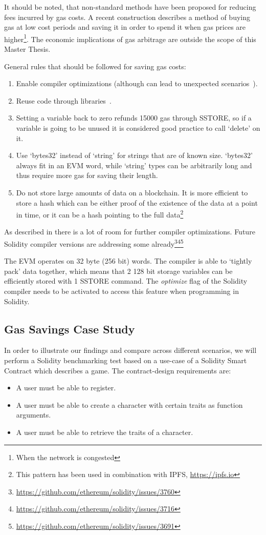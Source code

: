 It should be noted, that non-standard methods have been proposed for reducing fees incurred by gas costs. A recent construction \cite{gastoken} describes a method of buying gas at low cost periods and saving it in order to spend it when gas prices are higher\footnote{When the network is congested}. The economic implications of gas arbitrage are outside the scope of this Master Thesis. 

General rules that should be followed for saving gas costs:
\begin{enumerate}
    \item Enable compiler optimizations (although can lead to unexpected scenarios~\cite{compiler}).
    \item Reuse code through libraries~\cite{library}.
    \item Setting a variable back to zero refunds 15000 gas through SSTORE, so if a variable is going to be unused it is considered good practice to call `delete' on it. 
    \item Use `bytes32' instead of `string' for strings that are of known size. `bytes32' always fit in an EVM word, while `string' types can be arbitrarily long and thus require more gas for saving their length.
    \item Do not store large amounts of data on a blockchain. It is more efficient to store a hash which can be either proof of the existence of the data at a point in time, or it can be a hash pointing to the full data\footnote{This pattern has been used in combination with IPFS, \url{https://ipfs.io}}
\end{enumerate}

As described in \cite{DBLP:journals/corr/ChenLLZ17} there is a lot of room for further compiler optimizations. Future Solidity compiler versions are addressing some already\footnote{\url{https://github.com/ethereum/solidity/issues/3760}}\footnote{\url{https://github.com/ethereum/solidity/issues/3716}}\footnote{\url{https://github.com/ethereum/solidity/issues/3691}}

The EVM operates on 32 byte (256 bit) words. The compiler is able to `tightly pack' data together, which means that 2 128 bit storage variables can be efficiently stored with 1 SSTORE command. The \textit{optimize} flag of the Solidity compiler needs to be activated to access this feature when programming in Solidity.

\subsection{Gas Savings Case Study}
In order to illustrate our findings and compare across different scenarios, we will perform a Solidity benchmarking test based on a use-case of a Solidity Smart Contract which describes a game. The contract-design requirements are: 
\begin{itemize}
    \item A user must be able to register.
    \item A user must be able to create a character with certain traits as function arguments.
    \item A user must be able to retrieve the traits of a character.
\end{itemize}

